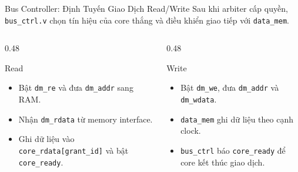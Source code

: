 \begin{frame}{Bus Controller: Định Tuyến Giao Dịch Read/Write}
    \small
    Sau khi arbiter cấp quyền, \texttt{bus\_ctrl.v} chọn tín hiệu của core thắng và điều khiển giao tiếp với \texttt{data\_mem}.

    \vspace{0.15cm}
    \begin{center}
    \end{center}

    \vspace{0.15cm}
    \begin{columns}[T]
        \begin{column}{0.48\textwidth}
            \begin{block}{Read}
                \scriptsize
                \begin{itemize}
                    \item Bật \texttt{dm\_re} và đưa \texttt{dm\_addr} sang RAM.
                    \item Nhận \texttt{dm\_rdata} từ memory interface.
                    \item Ghi dữ liệu vào \texttt{core\_rdata[grant\_id]} và bật \texttt{core\_ready}.
                \end{itemize}
            \end{block}
        \end{column}
        \begin{column}{0.48\textwidth}
            \begin{block}{Write}
                \scriptsize
                \begin{itemize}
                    \item Bật \texttt{dm\_we}, đưa \texttt{dm\_addr} và \texttt{dm\_wdata}.
                    \item \texttt{data\_mem} ghi dữ liệu theo cạnh clock.
                    \item \texttt{bus\_ctrl} báo \texttt{core\_ready} để core kết thúc giao dịch.
                \end{itemize}
            \end{block}
        \end{column}
    \end{columns}


\end{frame}

